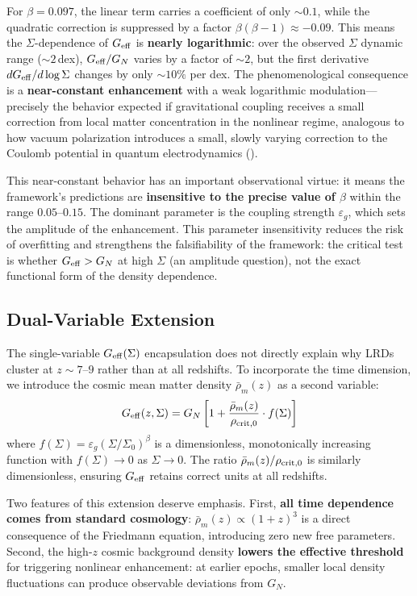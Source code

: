 \documentclass[apj,twocolumn,longbibliography,linenumbers]{aastex701}
\begin{document}
For $\beta = 0.097$, the linear term carries a coefficient of only ${\sim}0.1$, while the quadratic correction is suppressed by a factor $\beta(\beta{-}1) \approx -0.09$. This means the $\Sigma$-dependence of $G_{\rm eff}$ is \textbf{nearly logarithmic}: over the observed $\Sigma$ dynamic range (${\sim}2$\,dex), $G_{\rm eff}/G_N$ varies by a factor of ${\sim}2$, but the first derivative $dG_{\rm eff}/d\log\Sigma$ changes by only ${\sim}10\%$ per dex. The phenomenological consequence is a \textbf{near-constant enhancement} with a weak logarithmic modulation---precisely the behavior expected if gravitational coupling receives a small correction from local matter concentration in the nonlinear regime, analogous to how vacuum polarization introduces a small, slowly varying correction to the Coulomb potential in quantum electrodynamics (\citealt{Uehling1935}).

This near-constant behavior has an important observational virtue: it means the framework's predictions are \textbf{insensitive to the precise value of $\beta$} within the range $0.05$--$0.15$. The dominant parameter is the coupling strength $\varepsilon_g$, which sets the amplitude of the enhancement. This parameter insensitivity reduces the risk of overfitting and strengthens the falsifiability of the framework: the critical test is whether $G_{\rm eff} > G_N$ at high $\Sigma$ (an amplitude question), not the exact functional form of the density dependence.

\subsection{Dual-Variable Extension}

The single-variable $G_{\rm eff}(\Sigma)$ encapsulation does not directly explain why LRDs cluster at $z \sim 7$--$9$ rather than at all redshifts. To incorporate the time dimension, we introduce the cosmic mean matter density $\bar{\rho}_m(z)$ as a second variable:
\begin{equation}
G_{\rm eff}(z,\Sigma) = G_N \left[ 1 + \frac{\bar{\rho}_m(z)}{\rho_{\rm crit,0}} \cdot f(\Sigma) \right]
\label{eq:Geff_dual}
\end{equation}
where $f(\Sigma) = \varepsilon_g (\Sigma/\Sigma_0)^\beta$ is a dimensionless, monotonically increasing function with $f(\Sigma) \to 0$ as $\Sigma \to 0$. The ratio $\bar{\rho}_m(z)/\rho_{\rm crit,0}$ is similarly dimensionless, ensuring $G_{\rm eff}$ retains correct units at all redshifts.

Two features of this extension deserve emphasis. First, \textbf{all time dependence comes from standard cosmology}: $\bar{\rho}_m(z) \propto (1+z)^3$ is a direct consequence of the Friedmann equation, introducing zero new free parameters. Second, the high-$z$ cosmic background density \textbf{lowers the effective threshold} for triggering nonlinear enhancement: at earlier epochs, smaller local density fluctuations can produce observable deviations from $G_N$.
\end{document}
